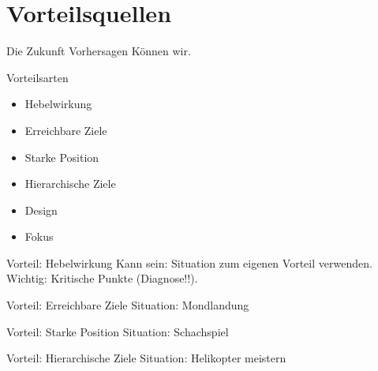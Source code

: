 
\section{Vorteilsquellen}

\begin{frame}[c]{Die Zukunft Vorhersagen}
    \Huge
    \pause
    Können wir.
\end{frame}


\begin{frame}[c]{Vorteilsarten}
    \Large
    \begin{itemize}
        \item Hebelwirkung
        \item Erreichbare Ziele
            \pause
        \item Starke Position
        \item Hierarchische Ziele
            \pause
        \item Design
        \item Fokus
    \end{itemize}
\end{frame}



\begin{frame}[c]{Vorteil: Hebelwirkung}
    \Large
    Kann sein: Situation zum eigenen Vorteil verwenden. \\
    Wichtig: Kritische Punkte (Diagnose!!).
\end{frame}


\begin{frame}[c]{Vorteil: Erreichbare Ziele}
    \Large
    Situation: Mondlandung \\
\end{frame}

\begin{frame}[c]{Vorteil: Starke Position}
    \Large
    Situation: Schachspiel
\end{frame}


\begin{frame}[c]{Vorteil: Hierarchische Ziele}
    \Large
    Situation: Helikopter meistern
\end{frame}




